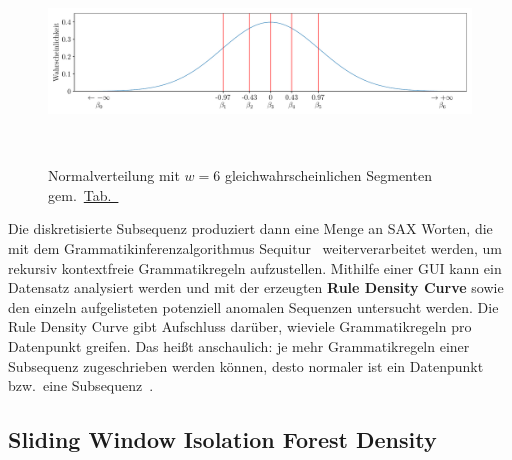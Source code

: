 \begin{figure}[t!]
    \centering
        \includegraphics[width=\linewidth]{ch4_anomalien/abbildungen/normalverteilung_SAX_segmente.pdf}
    \caption{Normalverteilung mit $w=6$ gleichwahrscheinlichen Segmenten gem.~\hyperref[tab:normalverteilung_segmente]{Tab.~}}
~\label{fig:normalverteilung_segmente}
\end{figure}

Die diskretisierte Subsequenz produziert dann eine Menge an SAX Worten, die mit dem Grammatikinferenzalgorithmus Sequitur~\cite{NevillManning1997}
weiterverarbeitet werden, um rekursiv kontextfreie Grammatikregeln aufzustellen. Mithilfe einer GUI kann ein Datensatz analysiert werden und mit der
erzeugten \textbf{Rule Density Curve} sowie den einzeln aufgelisteten potenziell anomalen Sequenzen untersucht werden. Die Rule Density Curve gibt Aufschluss
darüber, wieviele Grammatikregeln pro Datenpunkt greifen. Das heißt anschaulich: je mehr Grammatikregeln einer Subsequenz zugeschrieben werden können, desto normaler
ist ein Datenpunkt bzw.~eine Subsequenz~\cite{senin-gv2}.

\subsection{Sliding Window Isolation Forest Density}
\label{subsec:swifd}

